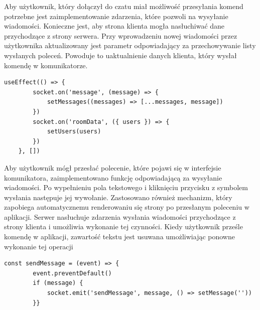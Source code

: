 Aby użytkownik, który dołączył do czatu miał możliwość przesyłania komend potrzebne jest zaimplementowanie zdarzenia, które pozwoli na wysyłanie wiadomości. Konieczne jest, aby strona klienta mogła nasłuchiwać dane przychodzące z strony serwera. Przy wprowadzeniu nowej wiadomości przez użytkownika aktualizowany jest parametr odpowiadający za przechowywanie listy wysłanych poleceń. Powoduje to uaktualnienie danych klienta, który wysłał komendę w komunikatorze.
\begin{lstlisting}[caption=Implementacja funkcji nasluchiwania wiadomosci i danych przychodzacych od serwera]
useEffect(() => {
        socket.on('message', (message) => {
            setMessages((messages) => [...messages, message])
        })
        socket.on('roomData', ({ users }) => {
            setUsers(users)
        })
    }, [])
\end{lstlisting}

Aby użytkownik mógł przesłać polecenie, które pojawi się w interfejsie komunikatora, zaimplementowano funkcję odpowiadającą za wysyłanie wiadomości. Po wypełnieniu pola tekstowego i kliknięciu przycisku z symbolem wysłania następuje jej wywołanie. Zastosowano również mechanizm, który zapobiega automatycznemu renderowaniu się strony po przesłanym poleceniu w aplikacji. Serwer nasłuchuje zdarzenia wysłania wiadomości przychodzące z strony klienta i umożliwia wykonanie tej czynności. Kiedy użytkownik prześle komendę w aplikacji, zawartość tekstu jest usuwana umożliwiając ponowne wykonanie tej operacji
\begin{lstlisting}[caption=Implementacja funkcji do wysylania wiadomosci]
const sendMessage = (event) => {
        event.preventDefault()
        if (message) {
            socket.emit('sendMessage', message, () => setMessage(''))
       	}}
\end{lstlisting}


